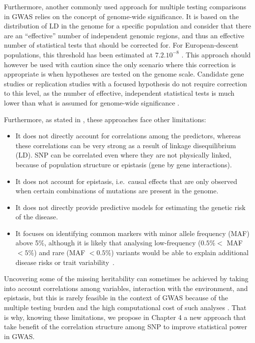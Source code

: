 \documentclass[]{book}
\begin{document}
Furthermore, another commonly used approach for multiple testing
comparisons in GWAS relies on the concept of genome-wide significance.
It is based on the distribution of LD in the genome for a specific
population and consider that there are an ``effective'' number of
independent genomic regions, and thus an effective number of statistical
tests that should be corrected for. For European-descent populations,
this threshold has been estimated at \(7.2.10^{-8}\)
\citep{dudbridge2008estimation}. This approach should however be used with
caution since the only scenario where this correction is appropriate is
when hypotheses are tested on the genome scale. Candidate gene studies
or replication studies with a focused hypothesis do not require
correction to this level, as the number of effective, independent
statistical tests is much lower than what is assumed for genome-wide
significance \citep{bush2012genome}.

Furthermore, as stated in \citep{maher_personal_2008}, these approaches face
other limitations:

\begin{itemize}
\item
  It does not directly account for correlations among the predictors,
  whereas these correlations can be very strong as a result of linkage
  disequilibrium (LD). SNP can be correlated even where they are not
  physically linked, because of population structure or epistasis
  (gene by gene interactions).
\item
  It does not account for epistasis, i.e.~causal effects that are only
  observed when certain combinations of mutations are present in the
  genome.
\item
  It does not directly provide predictive models for estimating the
  genetic risk of the disease.
\item
  It focuses on identifying common markers with minor
  allele frequency (MAF) above 5\(\%\), although it is likely that
  analysing low-frequency (\(0.5\% <\) MAF \(< 5\%\)) and rare (MAF \(<0.5\%\)) variants would be able to explain additional disease risks
  or trait variability~\citep{lee_rare-variant_2014}.
\end{itemize}

Uncovering some of the missing heritability can sometimes be achieved by
taking into account correlations among variables, interaction with the
environment, and epistasis, but this is rarely feasible in the context
of GWAS because of the multiple testing burden and the high
computational cost of such analyses \citep{manolio_finding_2009}. That is
why, knowing these limitations, we propose in Chapter 4 a
new approach that take benefit of the correlation structure among SNP to
improve statistical power in GWAS.
\end{document}
